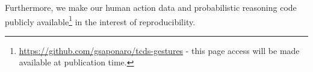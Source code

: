 Furthermore, we make our human action data and probabilistic reasoning code publicly available\footnote{\url{https://github.com/gsaponaro/tcds-gestures} - this page access will be made available at publication time.} in the interest of reproducibility.


